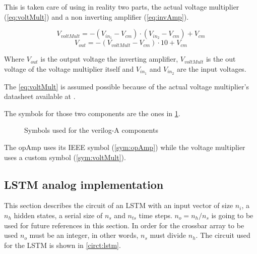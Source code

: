 This is taken care of using in reality two parts, the actual voltage multiplier (\cref{eq:voltMult}) and a non inverting amplifier (\cref{eq:invAmp}).

\begin{equation}\label{eq:voltMult}
  V_{voltMult}=-(V_{in_1}-V_{cm})\cdot (V_{in_2}-V_{cm}) + V_{cm}
\end{equation}
\begin{equation}\label{eq:invAmp}
  V_{out}=-(V_{voltMult}-V_{cm})\cdot10+V_{cm}
\end{equation}

Where $V_{out}$ is the output voltage the inverting amplifier, $V_{voltMult}$ is the out voltage of the voltage multiplier itself and $V_{in_1}$ and $V_{in_2}$ are the input voltages.

The \cref{eq:voltMult} is assumed possible because of the actual voltage multiplier's datasheet available at \cite{actualVoltMult}.

The symbols for those two components are the ones in \cref{sym:models}.

\begin{figure}[t]
  \centering
  \hspace*{1.5cm}
  \hfill
  \hspace*{1.5cm}
  \caption{Symbols used for the verilog-A components}
  \label{sym:models}
\end{figure}

The \ac{opAmp} uses its IEEE symbol (\cref{sym:opAmp}) while the voltage multiplier uses a custom symbol (\cref{sym:voltMult}).

\subsection{LSTM analog implementation}

This section describes the circuit of an \ac{LSTM} with an input vector of size $n_i$, a $n_h$ hidden states, a serial size of $n_s$ and $n_{ts}$ time steps. $n_o=n_h/n_s$ is going to be used for future references in this section. In order for the crossbar array to be used $n_o$ must be an integer, in other words, $n_s$ must divide $n_h$. The circuit used for the LSTM is shown in \cref{circt:lstm}.

\begin{figure*}[h]
  \centering
  
  \caption{\ac{LSTM} circuit}
  \label{circt:lstm}
\end{figure*}

